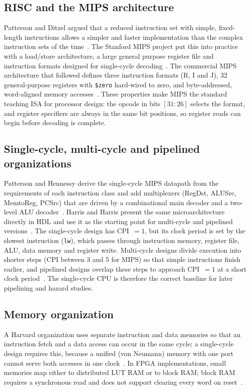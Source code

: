 \documentclass[conference]{IEEEtran}
\begin{document}
\subsection{RISC and the MIPS architecture}
Patterson and Ditzel argued that a reduced instruction set with simple,
fixed-length instructions allows a simpler and faster implementation than the
complex instruction sets of the time~\cite{patterson1980risc}. The Stanford MIPS
project put this into practice with a load/store architecture, a large general
purpose register file and instruction formats designed for single-cycle
decoding~\cite{hennessy1982mips}. The commercial MIPS architecture that followed
defines three instruction formats (R, I and J), 32 general-purpose registers
with \texttt{\$zero} hard-wired to zero, and byte-addressed, word-aligned
memory accesses~\cite{kane1992mips,mips32vol2}. These properties make MIPS the
standard teaching ISA for processor design: the opcode in bits $[31{:}26]$
selects the format, and register specifiers are always in the same bit
positions, so register reads can begin before decoding is complete.

\subsection{Single-cycle, multi-cycle and pipelined organizations}
Patterson and Hennessy derive the single-cycle MIPS datapath from the
requirements of each instruction class and add multiplexers (RegDst, ALUSrc,
MemtoReg, PCSrc) that are driven by a combinational main decoder and a
two-level ALU decoder~\cite{patterson2014cod}. Harris and Harris present the
same microarchitecture directly in HDL and use it as the starting point for
multi-cycle and pipelined versions~\cite{harris2013ddca}. The single-cycle
design has CPI~$=1$, but its clock period is set by the slowest instruction
(\texttt{lw}), which passes through instruction memory, register file, ALU,
data memory and register write. Multi-cycle designs divide execution into
shorter steps (CPI between 3 and 5 for MIPS) so that simple instructions finish
earlier, and pipelined designs overlap these steps to approach CPI~$=1$ at a
short clock period~\cite{hennessy2019caqa}. The single-cycle CPU is therefore
the correct baseline for later pipelining and hazard studies.

\subsection{Memory organization}
A Harvard organization uses separate instruction and data memories so that an
instruction fetch and a data access can occur in the same cycle; a
single-cycle design requires this, because a unified (von Neumann) memory with
one port cannot serve both accesses in one clock~\cite{patterson2014cod,
hennessy2019caqa}. In FPGA implementations, small memories map either to
distributed LUT RAM or to block RAM; block RAM requires a synchronous read and
does not support clearing every word on reset~\cite{harris2013ddca}.
\end{document}

